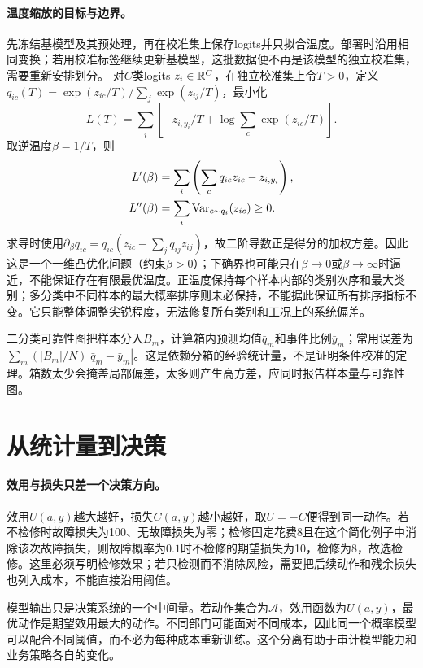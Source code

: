 \paragraph{温度缩放的目标与边界。}
先冻结基模型及其预处理，再在校准集上保存logits并只拟合温度。部署时沿用相同变换；若用校准标签继续更新基模型，这批数据便不再是该模型的独立校准集，需要重新安排划分。
对$C$类logits $z_i\in\mathbb{R}^C$，在独立校准集上令$T>0$，定义$q_{ic}(T)=\exp(z_{ic}/T)/\sum_j\exp(z_{ij}/T)$，最小化
\begin{equation}
 L(T)=\sum_i\left[-z_{i,y_i}/T+\log\sum_c\exp(z_{ic}/T)\right].
\end{equation}
取逆温度$\beta=1/T$，则
\begin{align}
 L'(\beta)&=\sum_i\left(\sum_cq_{ic}z_{ic}-z_{i,y_i}\right),\\
 L''(\beta)&=\sum_i\operatorname{Var}_{c\sim q_i}(z_{ic})\geq0.
\end{align}
求导时使用$\partial_\beta q_{ic}=q_{ic}(z_{ic}-\sum_jq_{ij}z_{ij})$，故二阶导数正是得分的加权方差。因此这是一个一维凸优化问题（约束$\beta>0$）；下确界也可能只在$\beta\to0$或$\beta\to\infty$时逼近，不能保证存在有限最优温度。正温度保持每个样本内部的类别次序和最大类别；多分类中不同样本的最大概率排序则未必保持，不能据此保证所有排序指标不变。它只能整体调整尖锐程度，无法修复所有类别和工况上的系统偏差。

二分类可靠性图把样本分入$B_m$，计算箱内预测均值$\bar q_m$和事件比例$\bar y_m$；常用误差为$\sum_m(|B_m|/N)|\bar q_m-\bar y_m|$。这是依赖分箱的经验统计量，不是证明条件校准的定理。箱数太少会掩盖局部偏差，太多则产生高方差，应同时报告样本量与可靠性图。

\section{从统计量到决策}
\paragraph{效用与损失只差一个决策方向。}
效用$U(a,y)$越大越好，损失$C(a,y)$越小越好，取$U=-C$便得到同一动作。若不检修时故障损失为100、无故障损失为零；检修固定花费8且在这个简化例子中消除该次故障损失，则故障概率为$0.1$时不检修的期望损失为10，检修为8，故选检修。这里必须写明检修效果；若只检测而不消除风险，需要把后续动作和残余损失也列入成本，不能直接沿用阈值。

模型输出只是决策系统的一个中间量。若动作集合为$\mathcal A$，效用函数为$U(a,y)$，最优动作是期望效用最大的动作。不同部门可能面对不同成本，因此同一个概率模型可以配合不同阈值，而不必为每种成本重新训练。这个分离有助于审计模型能力和业务策略各自的变化。

